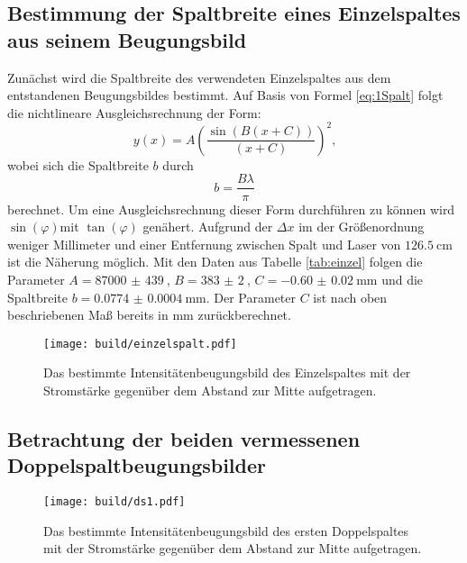 \subsection{Bestimmung der Spaltbreite eines Einzelspaltes aus seinem Beugungsbild}
Zunächst wird die Spaltbreite des verwendeten Einzelspaltes aus dem entstandenen Beugungsbildes bestimmt.
Auf Basis von Formel \eqref{eq:1Spalt} folgt die nichtlineare Ausgleichsrechnung der Form:
\begin{equation}
  y(x) = A \left( \frac{\sin(B (x+C))}{(x+C)}\right)^2 \text{,}
\end{equation}
wobei sich die Spaltbreite $b$ durch
\begin{equation}
  b = \frac{B \lambda}{\pi}
  \end{equation}
  berechnet. Um eine Ausgleichsrechnung dieser Form durchführen zu können wird $\sin(\varphi)$mit $\tan(\varphi)$ genähert.
  Aufgrund der $\Delta x$ im der Größenordnung weniger Millimeter und einer Entfernung
   zwischen Spalt und Laser von $\SI{126.5}{\centi\meter}$ ist die Näherung möglich. Mit den Daten aus Tabelle \ref{tab:einzel} folgen die Parameter
  $A = \SI{87000(439)}{}$, $B = \SI{383(2)}{}$, $C = \SI{-0.60(2)}{\milli\meter}$ und
   die Spaltbreite $b = \SI{0.0774(4)}{\milli\meter}$. Der Parameter $C$ ist nach oben beschriebenen Maß bereits in $\si{\milli\meter}$ zurückberechnet.
\begin{figure}
 \centering
 \caption{Das bestimmte Intensitätenbeugungsbild des Einzelspaltes mit der Stromstärke gegenüber dem Abstand zur Mitte aufgetragen.}
 \texttt{[image: build/einzelspalt.pdf]}
 \label{fig:einzer}
\end{figure}

\subsection{Betrachtung der beiden vermessenen Doppelspaltbeugungsbilder}
\begin{figure}
 \centering
 \caption{Das bestimmte Intensitätenbeugungsbild des ersten Doppelspaltes mit der Stromstärke gegenüber dem Abstand zur Mitte aufgetragen.}
 \texttt{[image: build/ds1.pdf]}
 \label{fig:dseins}
\end{figure}

